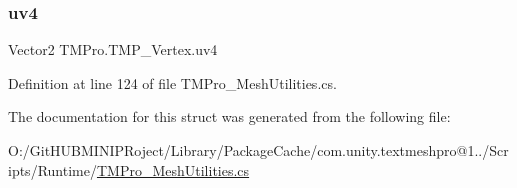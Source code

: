 \subsubsection{\texorpdfstring{uv4}{uv4}}
{\footnotesize\ttfamily Vector2 T\+M\+Pro.\+T\+M\+P\+\_\+\+Vertex.\+uv4}



Definition at line 124 of file T\+M\+Pro\+\_\+\+Mesh\+Utilities.\+cs.



The documentation for this struct was generated from the following file\+:\begin{DoxyCompactItemize}
\item 
O\+:/\+Git\+H\+U\+B\+M\+I\+N\+I\+P\+Roject/\+Library/\+Package\+Cache/com.\+unity.\+textmeshpro@1../\+Scripts/\+Runtime/\mbox{\hyperlink{_t_m_pro___mesh_utilities_8cs}{T\+M\+Pro\+\_\+\+Mesh\+Utilities.\+cs}}\end{DoxyCompactItemize}
